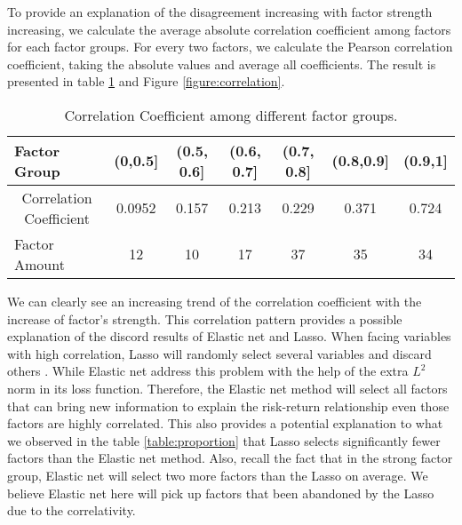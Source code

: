 To provide an explanation of the disagreement increasing with factor strength increasing, we calculate the average absolute correlation coefficient among factors for each factor groups.
For every two factors, we calculate the Pearson correlation coefficient, taking the absolute values and average all coefficients.
The result is presented in table \ref{table:Correlation} and Figure \ref{figure:correlation}.
\begin{table}[h]
	\centering
	\caption{Correlation Coefficient among different factor groups. }
	\label{table:Correlation}
	\begin{tabular}{l|cccccc}
		\hline
		\hline
		Factor Group                                 & (0,0.5{]} & (0.5, 0.6{]} & (0.6, 0.7{]} & (0.7, 0.8{]} & (0.8,0.9{]} & (0.9,1{]} \\ \hline
		\multicolumn{1}{c|}{Correlation Coefficient} & 0.0952    & 0.157        & 0.213        & 0.229        & 0.371       & 0.724   \\
		Factor Amount &12 & 10 &  17 & 37& 35 &34  \\ \hline \hline
	\end{tabular}
\end{table}
We can clearly see an increasing trend of the correlation coefficient with the increase of factor's strength.
This correlation pattern provides a possible explanation of the discord results of Elastic net and Lasso.
When facing variables with high correlation, Lasso will randomly select several variables and discard others \cite{Kozak2020}.
While Elastic net address this problem with the help of the extra $L^2$ norm in its loss function.
Therefore, the Elastic net method will select all factors that can bring new information to explain the risk-return relationship even those factors are highly correlated.
This also provides a potential explanation to what we observed in the table \ref{table:proportion}  that Lasso selects significantly fewer factors than the Elastic net method.
Also, recall the fact that in the strong factor group, Elastic net will select two more factors than the Lasso on average.
We believe Elastic net here will pick up factors that been abandoned by the Lasso due to the correlativity.
